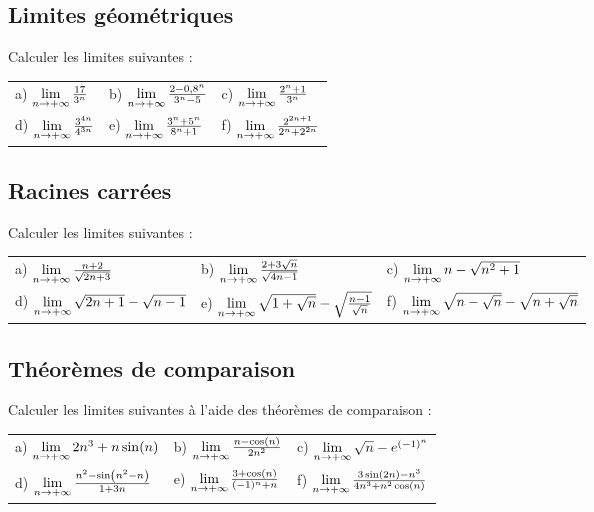 \documentclass[oneside,12pt]{book}          %
\begin{document}
\subsection{Limites géométriques}
Calculer les limites suivantes :

\renewcommand{\arraystretch}{1.5}
\begin{tabular}{p{} p{} p{}}
	a) ${\lim\limits_{n\to +\infty}}\,\frac{17}{3^n}$ & b) ${\lim\limits_{n\to +\infty}}\, \frac{2 - 0,8^n}{3^n - 5}$ & c) ${\lim\limits_{n\to +\infty}}\, \frac{2^n + 1}{3^n}$\\
	d) ${\lim\limits_{n\to +\infty}}\, \frac{3^{4n}}{4^{3n}}$ & e) ${\lim\limits_{n\to +\infty}}\, \frac{3^n + 5^n}{8^n + 1}$ & f) ${\lim\limits_{n\to +\infty}}\, \frac{2^{2n + 1}}{2^n + 2^{2n}}$
\end{tabular}



\subsection{Racines carrées}
Calculer les limites suivantes :

\renewcommand{\arraystretch}{1.5}
\begin{tabular}{p{} p{} p{}}
    a) ${\lim\limits_{n\to +\infty}}\, \frac{n+2}{\sqrt{2n+3}}$ & b) ${\lim\limits_{n\to +\infty}}\, \frac{2+3\sqrt{n}}{\sqrt{4n-1}}$ & c) ${\lim\limits_{n\to +\infty}}\, n-\sqrt{n^2+1}$\\
    d) ${\lim\limits_{n\to +\infty}}\, \sqrt{2n+1}-\sqrt{n-1}$ & e) ${\lim\limits_{n\to +\infty}}\, \sqrt{1+\sqrt{n}}-\sqrt{\frac{n-1}{\sqrt{n}}}$ & f) ${\lim\limits_{n\to +\infty}}\, \sqrt{n-\sqrt{n}}-\sqrt{n+\sqrt{n}}$
\end{tabular}



\subsection{Théorèmes de comparaison}
Calculer les limites suivantes à l'aide des théorèmes de comparaison :

\begin{tabular}{p{} p{} p{}}
    a) ${\lim\limits_{n\to +\infty}}\, 2n^3+n\sin(n)$ & b) ${\lim\limits_{n\to +\infty}}\, \frac{n-\cos(n)}{2n^2}$ & c) ${\lim\limits_{n\to +\infty}}\, \sqrt{n}-e^{(-1)^n}$\\
    d) ${\lim\limits_{n\to +\infty}}\, \frac{n^2-\sin\left(n^2-n\right)}{1+3n}$ & e) ${\lim\limits_{n\to +\infty}}\, \frac{3+\cos(n)}{(-1)^n+n}$ & f) ${\lim\limits_{n\to +\infty}}\, \frac{3\sin(2n)-n^3}{4n^3+n^2\cos(n)}$
\end{tabular}
\end{document}
